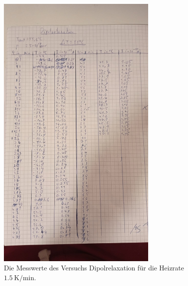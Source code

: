 \begin{figure}[h]
    \centering
    \includegraphics[width=0.7\textwidth]{latex/images/Messwerte_1.jpeg}
    \caption{Die Messwerte des Versuchs Dipolrelaxation für die Heizrate $\SI{1.5}{\kelvin\per\minute}$.}
\end{figure}

